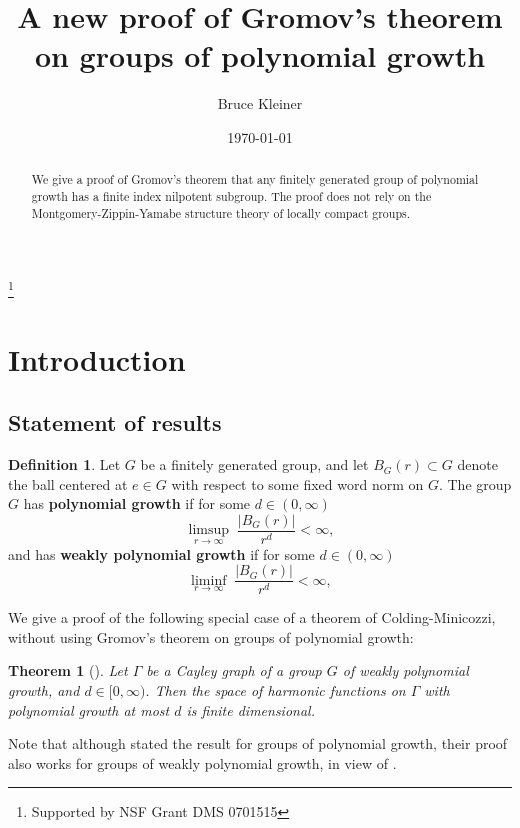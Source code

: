 \documentclass[12pt]{amsart}
\numberwithin{equation}{section}
\theoremstyle{plain}
\newtheorem{theorem}[equation]{Theorem}
\theoremstyle{remark}
\theoremstyle{definition}
\newtheorem{definition}[equation]{Definition}
\newcommand{\ra}{\rightarrow}
\def\Ga{\Gamma}
\def\ra{\rightarrow}
\begin{document}
\title[Groups of polynomial growth]{A new proof of Gromov's theorem 
on groups of polynomial growth}
\author{Bruce Kleiner}
\thanks{Supported by NSF Grant DMS 0701515}
\date{\today}
\maketitle

\begin{abstract}
We give a proof of Gromov's theorem that any finitely 
generated group of polynomial growth has a finite index 
nilpotent subgroup.  The proof does not rely on the 
Montgomery-Zippin-Yamabe structure theory of locally 
compact groups.
\end{abstract}


\tableofcontents



\section{Introduction}

\subsection{Statement of results}
\begin{definition}
Let $G$ be a finitely generated group,
and let $B_G(r)\subset G$ denote the ball centered at 
$e\in G$ with respect to some fixed word norm on $G$. 
The group $G$  has {\bf polynomial growth} if 
for some $d\in (0,\infty)$
\begin{equation}
\label{eqnstrongpolygrowth}
\limsup_{r\ra\infty}\;\frac{|B_G(r)|}{r^d}<\infty,
\end{equation}
and  has {\bf weakly polynomial growth} if 
for some $d\in (0,\infty)$
\begin{equation}
\label{eqnweakpolygrowth}
\liminf_{r\ra\infty}\;\frac{|B_G(r)|}{r^d}<\infty,
\end{equation}
\end{definition}



We give a  proof of the following  special case
of a theorem of Colding-Minicozzi, without using
Gromov's theorem on groups of polynomial growth:

\begin{theorem}[\cite{coldingminicozzi}]
\label{thmfinitedim}
Let $\Ga$ be a Cayley graph of a group $G$ of weakly polynomial 
growth,
and $d\in [0,\infty)$.
Then the space of harmonic functions on $\Ga$ with polynomial growth
at most $d$ is finite dimensional.
\end{theorem}
Note that although \cite{coldingminicozzi} stated the result for
groups of polynomial growth, their proof also works 
for groups of weakly polynomial growth, in view of \cite{wilkie}.
\end{document}

